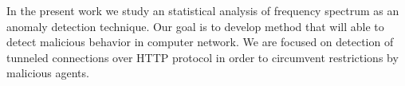 In the present work we study an statistical analysis of frequency  spectrum as an anomaly detection technique. Our goal is to develop method that will able to detect malicious behavior in computer network.  We are focused on detection of tunneled connections over  HTTP protocol in order to circumvent restrictions by malicious agents.


